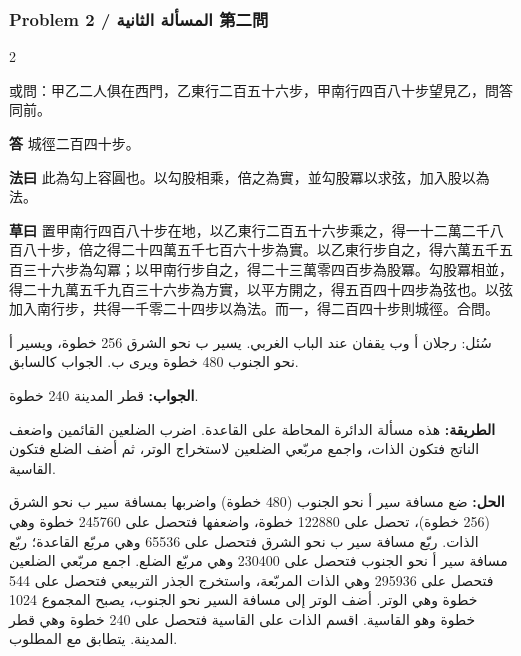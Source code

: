 \documentclass[11pt,a4paper]{article}
\newcommand{\ar}[1]{\arabicfont\beginR #1\endR}
\newcommand{\Answer}[1]{\par\noindent\textbf{\color{problemcolor}答} #1\par}
\newcommand{\Method}[1]{\par\noindent\textbf{\color{problemcolor}法曰} #1\par}
\newcommand{\Workings}[1]{\par\noindent\textbf{\color{problemcolor}草曰} #1\par}
\newcommand{\AnswerAr}{\par\noindent\textbf{\color{problemcolor}\ar{الجواب:}} }
\newcommand{\MethodAr}{\par\noindent\textbf{\color{problemcolor}\ar{الطريقة:}} }
\newcommand{\WorkingsAr}{\par\noindent\textbf{\color{problemcolor}\ar{الحل:}} }
\begin{document}
\subsubsection*{Problem 2 / \ar{المسألة الثانية} \quad 第二問}

\begin{paracol}{2}

\noindent 或問：甲乙二人俱在西門，乙東行二百五十六步，甲南行四百八十步望見乙，問答同前。

\vspace{0.2cm}

\Answer{城徑二百四十步。}

\vspace{0.2cm}

\Method{此為勾上容圓也。以勾股相乘，倍之為實，並勾股冪以求弦，加入股以為法。}

\vspace{0.2cm}

\Workings{置甲南行四百八十步在地，以乙東行二百五十六步乘之，得一十二萬二千八百八十步，倍之得二十四萬五千七百六十步為實。以乙東行步自之，得六萬五千五百三十六步為勾冪；以甲南行步自之，得二十三萬零四百步為股冪。勾股冪相並，得二十九萬五千九百三十六步為方實，以平方開之，得五百四十四步為弦也。以弦加入南行步，共得一千零二十四步以為法。而一，得二百四十步則城徑。合問。}

\switchcolumn

\ar{سُئل: رجلان أ وب يقفان عند الباب الغربي. يسير ب نحو الشرق 256 خطوة، ويسير أ نحو الجنوب 480 خطوة ويرى ب. الجواب كالسابق.}

\vspace{0.2cm}

\AnswerAr{قطر المدينة 240 خطوة.}

\vspace{0.2cm}

\MethodAr{هذه مسألة الدائرة المحاطة على القاعدة. اضرب الضلعين القائمين واضعف الناتج فتكون الذات، واجمع مربّعي الضلعين لاستخراج الوتر، ثم أضف الضلع فتكون القاسية.}

\vspace{0.2cm}

\WorkingsAr{ضع مسافة سير أ نحو الجنوب (480 خطوة) واضربها بمسافة سير ب نحو الشرق (256 خطوة)، تحصل على 122880 خطوة، واضعفها فتحصل على 245760 خطوة وهي الذات. ربّع مسافة سير ب نحو الشرق فتحصل على 65536 وهي مربّع القاعدة؛ ربّع مسافة سير أ نحو الجنوب فتحصل على 230400 وهي مربّع الضلع. اجمع مربّعي الضلعين فتحصل على 295936 وهي الذات المربّعة، واستخرج الجذر التربيعي فتحصل على 544 خطوة وهي الوتر. أضف الوتر إلى مسافة السير نحو الجنوب، يصبح المجموع 1024 خطوة وهو القاسية. اقسم الذات على القاسية فتحصل على 240 خطوة وهي قطر المدينة. يتطابق مع المطلوب.}

\end{paracol}
\end{document}
